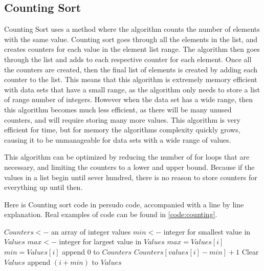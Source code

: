 \documentclass{article}
\begin{document}
\subsection{Counting Sort}
\begin{multicols}{2}
Counting Sort uses a method where the algorithm counts the number of elements with the same value. Counting sort goes through all the elements in the list, and creates counters for each value in the element list range. The algorithm then goes through the list and adds to each respective counter for each element. Once all the counters are created, then the final list of elements is created by adding each counter to the list. This means that this algorithm is extremely memory efficient with data sets that have a small range, as the algorithm only needs to store a list of range number of integers. However when the data set has a wide range, then this algorithm becomes much less efficient, as there will be many unused counters, and will require storing many more values. This algorithm is very efficient for time, but for memory the algorithms complexity quickly grows, causing it to be unmanageable for data sets with a wide range of values.

This algorithm can be optimized by reducing the  number of for loops that are necessary, and limiting the counters to a lower and upper bound. Because if the values in a list  begin until sever hundred, there is no reason to store counters for everything up until then.

Here is Counting sort code in persudo code, accompanied with a line by line explanation. Real examples of code can be found in \ref{code:counting}.
\end{multicols}
\begin{algorithmic}
\State $Counters<-$ an array of integer values
\State $min<-$ integer for smallest value in $Values$
\State $max<-$ integer for largest value in $Values$
\State $max=Values[i]$
\EndIf
{}
\State $min=Values[i]$
\EndIf
\EndFor
{}
\State append $0$ to $Counters$
\EndFor
{}
\State $Counters[values[i]-min] + 1$
\EndFor
\State Clear $Values$
\State append $(i+min)$ to $Values$
\EndFor
\EndFor
\EndFunction
\end{algorithmic}
\end{document}
